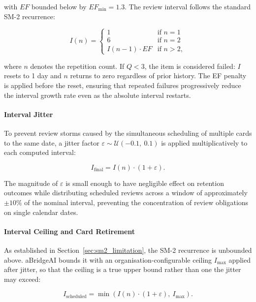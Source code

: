 with $EF$ bounded below by $EF_{\min} = 1.3$. The review 
interval follows the standard SM-2 recurrence:

\begin{equation}
I(n) =
\begin{cases}
1               & \text{if } n = 1 \\
6               & \text{if } n = 2 \\
I(n-1) \cdot EF & \text{if } n > 2,
\end{cases}
\end{equation}

where $n$ denotes the repetition count. If $Q < 3$, the item is considered failed: $I$ resets to 1 day and $n$ returns to zero regardless of prior history. The EF penalty is applied before the reset, ensuring that repeated failures progressively reduce the interval growth rate even as the absolute interval restarts.

\paragraph{Interval Jitter}
To prevent review storms caused by the simultaneous scheduling of multiple cards to the same date, a jitter factor $\varepsilon \sim \mathcal{U}(-0.1,\ 0.1)$ is applied multiplicatively to each computed interval:

\begin{equation}
I_{\text{final}} = I(n) \cdot (1 + \varepsilon).
\end{equation}

The magnitude of $\varepsilon$ is small enough to have negligible effect on retention outcomes while distributing scheduled reviews across a window of approximately $\pm 10\%$ of the nominal interval, preventing the concentration of review obligations on single calendar dates.

\paragraph{Interval Ceiling and Card Retirement}
As established in Section~\ref{sec:sm2_limitation}, the SM-2 recurrence is unbounded above. aBridgeAI bounds it with an organisation-configurable ceiling $I_{\max}$ applied after jitter, so that the ceiling is a true upper bound rather than one the jitter may exceed:

\begin{equation}
I_{\text{scheduled}} = \min\left(I(n) \cdot (1 + \varepsilon),\ I_{\max}\right).
\end{equation}

